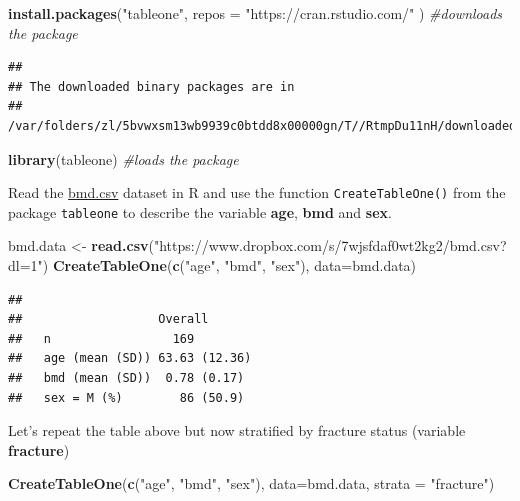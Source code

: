 \documentclass[
]{book}
\newenvironment{Shaded}{\begin{snugshade}}{\end{snugshade}}
\newcommand{\AttributeTok}[1]{\textcolor[rgb]{0.13,0.29,0.53}{#1}}
\newcommand{\CommentTok}[1]{\textcolor[rgb]{0.56,0.35,0.01}{\textit{#1}}}
\newcommand{\FunctionTok}[1]{\textcolor[rgb]{0.13,0.29,0.53}{\textbf{#1}}}
\newcommand{\NormalTok}[1]{#1}
\newcommand{\OtherTok}[1]{\textcolor[rgb]{0.56,0.35,0.01}{#1}}
\newcommand{\StringTok}[1]{\textcolor[rgb]{0.31,0.60,0.02}{#1}}
\begin{document}
\begin{Shaded}
\begin{Highlighting}[]
\FunctionTok{install.packages}\NormalTok{(}\StringTok{"tableone"}\NormalTok{, }
                 \AttributeTok{repos =} \StringTok{"https://cran.rstudio.com/"}\NormalTok{ ) }\CommentTok{\#downloads the package}
\end{Highlighting}
\end{Shaded}

\begin{verbatim}
## 
## The downloaded binary packages are in
##  /var/folders/zl/5bvwxsm13wb9939c0btdd8x00000gn/T//RtmpDu11nH/downloaded_packages
\end{verbatim}

\begin{Shaded}
\begin{Highlighting}[]
\FunctionTok{library}\NormalTok{(tableone)            }\CommentTok{\#loads the package}
\end{Highlighting}
\end{Shaded}

Read the \href{https://www.dropbox.com/s/7wjsfdaf0wt2kg2/bmd.csv?dl=1}{bmd.csv}
dataset in R and use the function \texttt{CreateTableOne()} from the package \texttt{tableone}
to describe the variable \textbf{age}, \textbf{bmd} and \textbf{sex}.

\begin{Shaded}
\begin{Highlighting}[]
\NormalTok{bmd.data }\OtherTok{\textless{}{-}} \FunctionTok{read.csv}\NormalTok{(}\StringTok{"https://www.dropbox.com/s/7wjsfdaf0wt2kg2/bmd.csv?dl=1"}\NormalTok{)}
\FunctionTok{CreateTableOne}\NormalTok{(}\FunctionTok{c}\NormalTok{(}\StringTok{"age"}\NormalTok{, }\StringTok{"bmd"}\NormalTok{, }\StringTok{"sex"}\NormalTok{), }\AttributeTok{data=}\NormalTok{bmd.data)}
\end{Highlighting}
\end{Shaded}

\begin{verbatim}
##                  
##                   Overall      
##   n                 169        
##   age (mean (SD)) 63.63 (12.36)
##   bmd (mean (SD))  0.78 (0.17) 
##   sex = M (%)        86 (50.9)
\end{verbatim}

Let's repeat the table above but now stratified by fracture status (variable
\textbf{fracture})

\begin{Shaded}
\begin{Highlighting}[]
\FunctionTok{CreateTableOne}\NormalTok{(}\FunctionTok{c}\NormalTok{(}\StringTok{"age"}\NormalTok{, }\StringTok{"bmd"}\NormalTok{, }\StringTok{"sex"}\NormalTok{), }\AttributeTok{data=}\NormalTok{bmd.data, }\AttributeTok{strata =} \StringTok{"fracture"}\NormalTok{)}
\end{Highlighting}
\end{Shaded}
\end{document}
